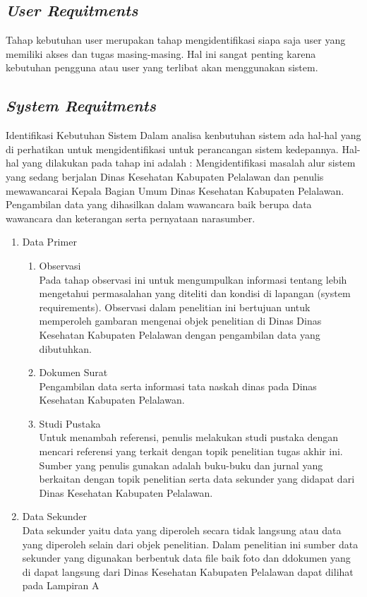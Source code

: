\subsection{\textit{User Requitments}}
Tahap kebutuhan user merupakan tahap mengidentifikasi siapa saja user yang memiliki akses dan tugas masing-masing. Hal ini sangat penting karena kebutuhan pengguna atau user yang terlibat akan menggunakan sistem.

\subsection{\textit{System Requitments}}
Identifikasi Kebutuhan Sistem
Dalam analisa kenbutuhan sistem ada hal-hal yang di perhatikan untuk mengidentifikasi untuk perancangan sistem kedepannya. Hal-hal yang dilakukan pada tahap ini adalah :
Mengidentifikasi masalah alur sistem yang sedang berjalan Dinas Kesehatan Kabupaten Pelalawan dan penulis mewawancarai Kepala Bagian Umum Dinas Kesehatan Kabupaten Pelalawan. Pengambilan data yang dihasilkan dalam wawancara baik berupa data wawancara dan keterangan serta pernyataan narasumber.
\begin{enumerate}
	\item 	Data Primer
	\begin{enumerate}
		\item 	Observasi \\
		Pada tahap observasi ini untuk mengumpulkan informasi tentang lebih mengetahui permasalahan yang diteliti dan kondisi di lapangan (system requirements). Observasi dalam penelitian ini bertujuan untuk memperoleh gambaran mengenai objek penelitian di Dinas Dinas Kesehatan Kabupaten Pelalawan dengan pengambilan data yang dibutuhkan.
		\item 	Dokumen Surat\\
		Pengambilan data serta informasi tata naskah dinas pada Dinas Kesehatan Kabupaten Pelalawan.
		\item	Studi Pustaka\\
		Untuk menambah referensi, penulis melakukan studi pustaka dengan mencari referensi yang terkait dengan topik penelitian tugas akhir ini. Sumber yang penulis gunakan adalah buku-buku dan jurnal yang berkaitan dengan topik penelitian serta data sekunder yang didapat dari Dinas Kesehatan Kabupaten Pelalawan.
	\end{enumerate}
	
	\item Data Sekunder \\
	Data sekunder yaitu data yang diperoleh secara tidak langsung atau data yang diperoleh selain dari objek penelitian. Dalam penelitian ini sumber data sekunder yang digunakan berbentuk data file baik foto dan ddokumen yang di dapat langsung dari Dinas Kesehatan Kabupaten Pelalawan dapat dilihat pada Lampiran A 

\end{enumerate}


